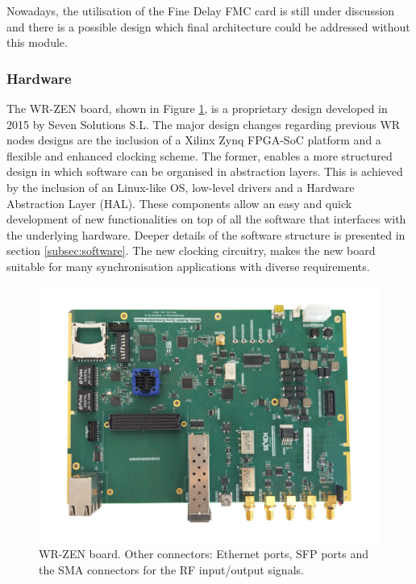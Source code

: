 Nowadays, the utilisation of the Fine Delay FMC card is still under discussion
and there is a possible design which final architecture could be addressed
without this module.

\subsubsection{Hardware} \label{subsec:hardware}

The WR-ZEN board, shown in Figure \ref{fig:wrzen}, is a proprietary design developed in 2015 by Seven Solutions S.L. The major design changes regarding previous WR nodes designs are the inclusion of a Xilinx Zynq FPGA-SoC platform and a flexible and enhanced clocking scheme. The former, enables a more structured design in which software can be organised in abstraction layers. This is achieved by the inclusion of an Linux-like OS, low-level drivers and a
Hardware Abstraction Layer (HAL). These components allow an easy and quick
development of new functionalities on top of all the software that interfaces
with the underlying hardware. Deeper details of the software structure is
presented in section  \ref{subsec:software}. The new clocking circuitry, makes
the new board suitable for many synchronisation applications with diverse
requirements.

\begin{figure}[H] \centering
	\includegraphics[width=0.7\linewidth]{img/wrzenv3_scaled}
	\caption[WR-ZEN board picture]{WR-ZEN board. Other connectors: Ethernet
	ports, SFP ports and the SMA connectors for the RF input/output
    signals.} \label{fig:wrzen} 
\end{figure}

